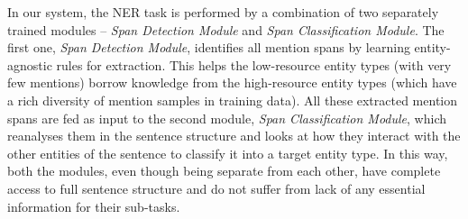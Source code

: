 


In our system, the NER task is performed by a combination of two separately trained modules -- \textit{Span Detection Module}
and \textit{Span Classification Module}.
The first one, \textit{Span Detection Module}, identifies all mention spans by learning entity-agnostic rules for extraction. This helps the low-resource entity types (with very few mentions) borrow knowledge from the high-resource entity types (which have a rich diversity of mention samples in training data). 
All these extracted mention spans are fed as input to the second module, \textit{Span Classification Module}, which reanalyses them in the sentence structure and looks at how they interact with the other entities of the sentence to classify it into a target entity type. In this way, both the modules, even though being separate from each other, have complete access to full sentence structure and do not suffer from lack of any essential information for their sub-tasks.

